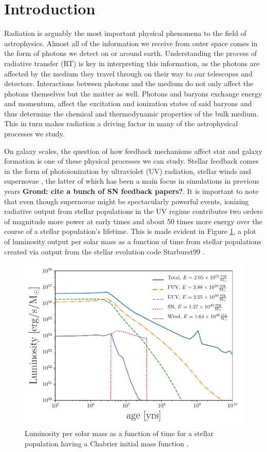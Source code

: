 \documentclass[fleq,usenatbib]{mnras}
\newcommand{\comment}[1]{\textbf{\color{red}#1}}
\begin{document}
\section{Introduction}\label{sec:intr}
Radiation is arguably the most important physical phenomena to the field of
astrophysics. Almost all of the information we receive from outer space comes 
in the form of photons we detect on or around earth. Understanding the process 
of radiative transfer (RT) is key in interpreting this information, as the 
photons are affected by the medium they travel through on their way to our 
telescopes and detectors. Interactions between photons and the medium do not 
only affect the photons themselves but the matter as well. Photons and baryons 
exchange energy and momentum, affect the excitation and ionization states of 
said baryons and thus determine the chemical and thermodynamic properties of 
the bulk medium. This in turn makes radiation a driving factor in many of the 
astrophysical processes we study.

On galaxy scales, the question of how feedback mechanisms affect star and 
galaxy formation is one of these physical processes we can study. Stellar 
feedback comes in the form of photoionization by ultraviolet (UV) radiation, 
stellar winds and supernovae \citep{leithererEt99}, the latter of which has 
been a main focus in simulations in previous years \comment{Grond: 
cite a bunch of SN feedback papers?}. It is important to note that even 
though supernovae might be spectacularly powerful events, ionizing radiative 
output from stellar populations in the UV regime contributes two orders of 
magnitude more power at early times and about 50 times more energy over the 
course of a stellar population's lifetime. This is made evident in Figure 
\ref{fig:uvsn}, a plot of luminosity output per solar mass as a function of 
time from stellar populations created via output from the stellar evolution 
code Starburst99 
\citep{leithererEt99}. 
\begin{figure}
\includegraphics[width=1\linewidth]{Figures/uvsn.pdf}
\caption{Luminosity per solar mass as a function of time for a stellar 
population having a Chabrier initial mass function \citep{chabrier03}.}
\label{fig:uvsn}
\end{figure}
\end{document}

